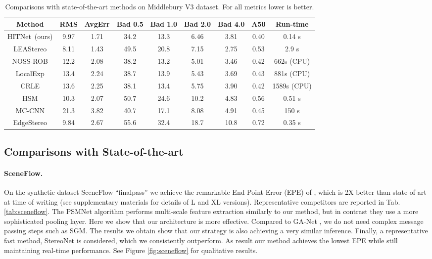 \documentclass[final]{cvpr}
\newcommand{\algoname}{HITNet}
\begin{document}
\begin{table*}
\begin{center}
\begin{tabular}{|c|c|c|c|c|c|c|c|c|}
\hline
 {Method} & {RMS} &  {AvgErr} & {Bad 0.5} & {Bad 1.0} & {Bad 2.0} & {Bad 4.0} & {A50} & {Run-time}\\
\hline
    { \algoname \ (ours)} & 9.97 & 1.71 & 34.2  & 13.3 & 6.46 & 3.81 & 0.40 & 0.14 s\\
    {LEAStereo \cite{cheng2020hierarchical}} & 8.11 & 1.43 & 49.5 & 20.8 & 7.15 & 2.75 & 0.53 & 2.9  s\\ 
    {NOSS-ROB} \cite{li2019} & 12.2 & 2.08 & 38.2 & 13.2 & 5.01 & 3.46 & 0.42 & 662s (CPU)\\
    {LocalExp} \cite{Taniai18} & 13.4 & 2.24 & 38.7 & 13.9 & 5.43 & 3.69 & 0.43 & 881s (CPU)\\
    {CRLE} \cite{CRLE} & 13.6 & 2.25 & 38.1 & 13.4 & 5.75 & 3.90 & 0.42 & 1589s (CPU)\\
    {HSM} \cite{yang2019hierarchical} & 10.3 & 2.07 & 50.7 & 24.6 & 10.2 & 4.83 & 0.56 & 0.51 s\\
    {MC-CNN} \cite{zbontar2016stereo} & 21.3 & 3.82 & 40.7 & 17.1 & 8.08 & 4.91 & 0.45 & 150 s\\
    {EdgeStereo} \cite{song2020edgestereo} & 9.84 & 2.67 & 55.6 & 32.4 & 18.7 & 10.8 & 0.72 & 0.35 s\\
\hline
\end{tabular}
\caption{Comparisons with state-of-the-art methods on Middlebury V3 dataset. For all metrics lower is better.}
\label{tab:middlebury}
\end{center}
\vspace{-20pt}
\end{table*}


\subsection{Comparisons with State-of-the-art}
\paragraph{SceneFlow.} On the synthetic dataset SceneFlow ``finalpass'' we achieve the remarkable End-Point-Error (EPE) of , which is 2X better than state-of-art at time of writing (see supplementary materials for details of L and XL versions). Representative competitors are reported in Tab. \ref{tab:sceneflow}. The PSMNet algorithm \cite{chang2018pyramid} performs multi-scale feature extraction similarly to our method, but in contrast they use a more sophisticated pooling layer. Here we show that our architecture is more effective. Compared to GA-Net \cite{Zhang2019GANet}, we do not need complex message passing steps such as SGM. The results we obtain show that our strategy is also achieving a very similar inference. Finally, a representative fast method, StereoNet \cite{stereonet} is considered, which we consistently outperform.
As result our method achieves the lowest EPE while still maintaining real-time performance. See Figure \ref{fig:sceneflow} for qualitative results.
\end{document}
